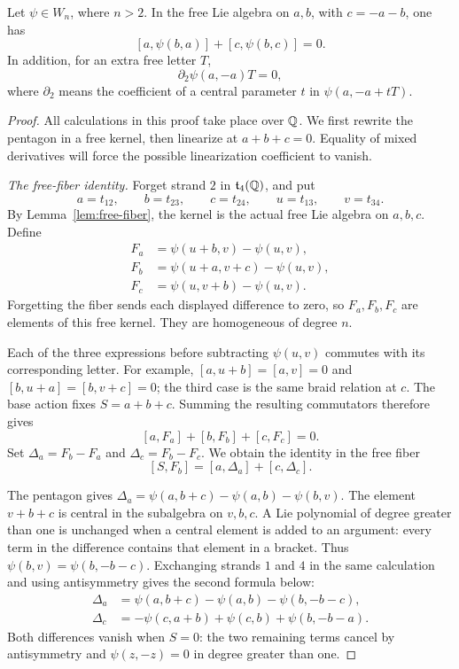 \begin{lemma}\label{lem:special}
Let \(\psi\in W_n\), where \(n>2\).  In the free Lie algebra on
\(a,b\), with \(c=-a-b\), one has
\begin{equation}\label{eq:special}
 [a,\psi(b,a)]+[c,\psi(b,c)]=0.
\end{equation}
In addition, for an extra free letter \(T\),
\begin{equation}\label{eq:special-linearization}
 \partial_2\psi(a,-a)T=0,
\end{equation}
where \(\partial_2\) means the coefficient of a central parameter
\(t\) in \(\psi(a,-a+tT)\).
\end{lemma}
\begin{proof}
All calculations in this proof take place over \(\mathbb Q\).  We first
rewrite the pentagon in a free kernel, then linearize at \(a+b+c=0\).
Equality of mixed derivatives will force the possible linearization
coefficient to vanish.

\emph{The free-fiber identity.}
Forget strand \(2\) in \(\mathfrak t_4(\mathbb Q)\), and put
\[
 a=t_{12},\qquad b=t_{23},\qquad c=t_{24},\qquad
 u=t_{13},\qquad v=t_{34}.
\]
By Lemma~\ref{lem:free-fiber}, the kernel is the actual free Lie
algebra on \(a,b,c\).  Define
\begin{align*}
 F_a&=\psi(u+b,v)-\psi(u,v),\\
 F_b&=\psi(u+a,v+c)-\psi(u,v),\\
 F_c&=\psi(u,v+b)-\psi(u,v).
\end{align*}
Forgetting the fiber sends each displayed difference to zero, so
\(F_a,F_b,F_c\) are elements of this free kernel.  They are
homogeneous of degree \(n\).

Each of the three expressions before subtracting \(\psi(u,v)\)
commutes with its corresponding letter.  For example,
\([a,u+b]=[a,v]=0\) and
\([b,u+a]=[b,v+c]=0\); the third case is the same braid relation at
\(c\).  The base action fixes \(S=a+b+c\).  Summing the resulting
commutators therefore gives
\[
 [a,F_a]+[b,F_b]+[c,F_c]=0.
\]
Set \(\Delta_a=F_b-F_a\) and \(\Delta_c=F_b-F_c\).  We obtain the
identity in the free fiber
\begin{equation}\label{eq:special-fiber}
 [S,F_b]=[a,\Delta_a]+[c,\Delta_c].
\end{equation}

The pentagon gives
\(\Delta_a=\psi(a,b+c)-\psi(a,b)-\psi(b,v)\).
The element \(v+b+c\) is central in the subalgebra on \(v,b,c\).
A Lie polynomial of degree greater than one is unchanged when a
central element is added to an argument: every term in the difference
contains that element in a bracket.  Thus \(\psi(b,v)=\psi(b,-b-c)\).
Exchanging strands \(1\) and \(4\) in the same calculation and using
antisymmetry gives the second formula below:
\begin{align}
 \Delta_a&=\psi(a,b+c)-\psi(a,b)-\psi(b,-b-c),
       \label{eq:special-delta-a}\\
 \Delta_c&=-\psi(c,a+b)+\psi(c,b)+\psi(b,-b-a).
       \label{eq:special-delta-c}
\end{align}
Both differences vanish when \(S=0\): the two remaining terms cancel
by antisymmetry and \(\psi(z,-z)=0\) in degree greater than one.


\end{proof}
